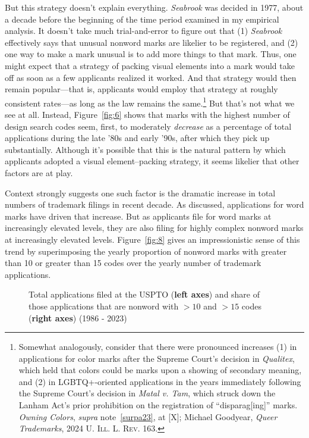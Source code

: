 \documentclass[letterpaper, 11pt, oneside]{article}
\begin{document}
But this strategy doesn't explain everything. \textit{Seabrook} was decided in 1977, about a decade before the beginning of the time period examined in my empirical analysis. It doesn't take much trial-and-error to figure out that (1) \textit{Seabrook} effectively says that unusual nonword marks are likelier to be registered, and (2) one way to make a mark unusual is to add more things to that mark. Thus, one might expect that a strategy of packing visual elements into a mark would take off as soon as a few applicants realized it worked. And that strategy would then remain popular—that is, applicants would employ that strategy at roughly consistent rates—as long as the law remains the same.\footnote{Somewhat analogously, consider that there were pronounced increases (1) in applications for color marks after the Supreme Court's decision in \textit{Qualitex}, which held that colors could be marks upon a showing of secondary meaning, and (2) in LGBTQ+-oriented applications in the years immediately following the Supreme Court's decision in \textit{Matal v. Tam}, which struck down the Lanham Act's prior prohibition on the registration of ``disparag[ing]'' marks. \textit{Owning Colors}, \textit{supra} note~\ref{surpa23}, at [X]; Michael Goodyear, \textit{Queer Trademarks}, 2024 \textsc{U. Ill. L. Rev.} 163.} But that's not what we see at all. Instead, Figure~\ref{fig:6} shows that marks with the highest number of design search codes seem, first, to moderately \textit{decrease} as a percentage of total applications during the late '80s and early '90s, after which they pick up substantially. Although it's possible that this is the natural pattern by which applicants adopted a visual element–packing strategy, it seems likelier that other factors are at play.

Context strongly suggests one such factor is the dramatic increase in total numbers of trademark filings in recent decade. As discussed, applications for word marks have driven that increase. But as applicants file for word marks at increasingly elevated levels, they are also filing for highly complex nonword marks at increasingly elevated levels. Figure~\ref{fig:8} gives an impressionistic sense of this trend by superimposing the yearly proportion of nonword marks with greater than 10 or greater than 15 codes over the yearly number of trademark applications.

\addtocounter{figure}{-3}

\begin{figure}[H]
\centering

\caption{\label{fig:7} Total applications filed at the USPTO (\textbf{\color{oxfordblue}left axes}) and share of those applications that are nonword with $>10$ and $>15$ codes (\textbf{\color{seafoam}right axes}) (1986 - 2023)}
\end{figure}
\end{document}
